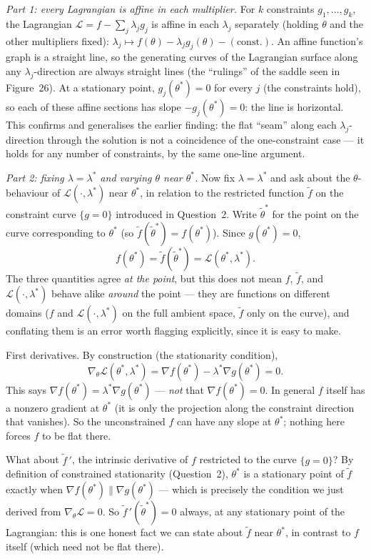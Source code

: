 \documentclass[a4paper,oneside,12pt]{extarticle}
\theoremstyle{plain}
\theoremstyle{definition}
\theoremstyle{remark}
\begin{document}
\emph{Part 1: every Lagrangian is affine in each multiplier.}
For $k$ constraints $g_1,\ldots,g_k$, the Lagrangian
$\mathcal{L}=f-\sum_j \lambda_j g_j$ is affine in each $\lambda_j$
separately (holding $\theta$ and the other multipliers fixed):
$\lambda_j \mapsto f(\theta) - \lambda_j g_j(\theta) - (\text{const.})$.
An affine function's graph is a straight line, so the generating
curves of the Lagrangian surface along any $\lambda_j$-direction
are always straight lines (the ``rulings'' of the saddle seen in
Figure~26).  At a stationary point, $g_j(\theta^*)=0$ for every $j$
(the constraints hold), so each of these affine sections has slope
$-g_j(\theta^*) = 0$: the line is horizontal.  This confirms and
generalises the earlier finding: the flat ``seam'' along each
$\lambda_j$-direction through the solution is not a coincidence
of the one-constraint case --- it holds for any number of
constraints, by the same one-line argument.

\emph{Part 2: fixing $\lambda=\lambda^*$ and varying $\theta$ near $\theta^*$.}
Now fix $\lambda=\lambda^*$ and ask about the $\theta$-behaviour of
$\mathcal{L}(\cdot,\lambda^*)$ near $\theta^*$, in relation to the
restricted function $\tilde f$ on the constraint curve
$\{g=0\}$ introduced in Question~2.  Write $\tilde\theta^*$ for the
point on the curve corresponding to $\theta^*$ (so
$\tilde f(\tilde\theta^*) = f(\theta^*)$).  Since $g(\theta^*)=0$,
\[
  f(\theta^*) = \tilde f(\tilde\theta^*) = \mathcal{L}(\theta^*,\lambda^*).
\]
The three quantities agree \emph{at the point}, but this does not
mean $f$, $\tilde f$, and $\mathcal{L}(\cdot,\lambda^*)$ behave alike
\emph{around} the point --- they are functions on different domains
($f$ and $\mathcal{L}(\cdot,\lambda^*)$ on the full ambient space,
$\tilde f$ only on the curve), and conflating them is an error worth
flagging explicitly, since it is easy to make.

First derivatives.  By construction (the stationarity condition),
\[
  \nabla_\theta\mathcal{L}(\theta^*,\lambda^*)
  = \nabla f(\theta^*) - \lambda^*\nabla g(\theta^*) = 0.
\]
This says $\nabla f(\theta^*) = \lambda^*\nabla g(\theta^*)$ ---
\emph{not} that $\nabla f(\theta^*)=0$.  In general $f$ itself has a
nonzero gradient at $\theta^*$ (it is only the projection along the
constraint direction that vanishes).  So the unconstrained $f$ can
have any slope at $\theta^*$; nothing here forces $f$ to be flat
there.

What about $\tilde f\,'$, the intrinsic derivative of $f$ restricted
to the curve $\{g=0\}$?  By definition of constrained stationarity
(Question~2), $\theta^*$ is a stationary point of $\tilde f$ exactly
when $\nabla f(\theta^*)\parallel\nabla g(\theta^*)$ --- which is
precisely the condition we just derived from $\nabla_\theta
\mathcal{L}=0$.  So $\tilde f\,'(\tilde\theta^*)=0$ always, at any
stationary point of the Lagrangian: this is one honest fact we can
state about $\tilde f$ near $\theta^*$, in contrast to $f$ itself
(which need not be flat there).
\end{document}
